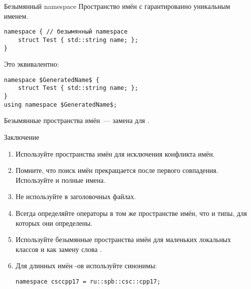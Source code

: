 \documentclass[aspectration=1610,t]{beamer}
\begin{document}
\begin{frame}[fragile]{Безымянный namespace}
    Пространство имён с гарантированно уникальным именем.
    \begin{lstlisting}
namespace { // безымянный namespace
    struct Test { std::string name; };
}
    \end{lstlisting}
Это эквивалентно:
    \begin{lstlisting}
namespace $GeneratedName$ {
    struct Test { std::string name; };
}
using namespace $GeneratedName$;
    \end{lstlisting}

\medskip
Безымянные пространства имён~--- замена для .
\end{frame}

\begin{frame}[fragile]{Заключение}
    \begin{enumerate}
        \pause\item Используйте пространства имён для исключения конфликта имён.
        
        \pause\item Помните, что поиск имён прекращается после первого совпадения.
            Используйте  и полные имена.        

        \pause\item Не используйте  в заголовочных файлах.

        \pause\item Всегда определяйте операторы в том же пространстве имён, что и
            типы, для которых они определены.

        \pause\item Используйте безымянные пространства имён для маленьких локальных классов и как замену слова .

        \pause\item Для длинных имён -ов используйте синонимы:
    \begin{lstlisting}
namespace csccpp17 = ru::spb::csc::cpp17;
    \end{lstlisting}
    \end{enumerate}
\end{frame}
\end{document}
